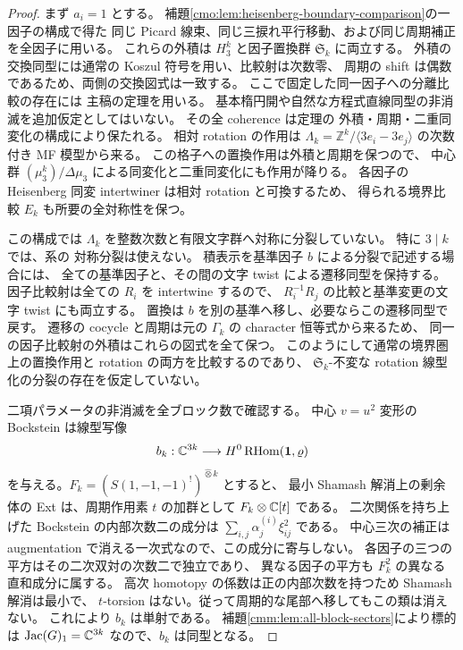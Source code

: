 \begin{proof}
まず $a_i=1$ とする。
補題\ref{cmo:lem:heisenberg-boundary-comparison}の一因子の構成で得た
同じ Picard 線束、同じ三捩れ平行移動、および同じ周期補正を全因子に用いる。
これらの外積は $H_3^k$ と因子置換群 $\mathfrak S_k$ に両立する。
外積の交換同型には通常の Koszul 符号を用い、比較射は次数零、
周期の shift は偶数であるため、両側の交換図式は一致する。
ここで固定した同一因子への分離比較の存在には
主稿の定理を用いる。
基本楕円開や自然な方程式直線同型の非消滅を追加仮定としてはいない。
その全 coherence は定理の
外積・周期・二重同変化の構成により保たれる。
相対 rotation の作用は
$\Lambda_k=\mathbb Z^k/\langle3e_i-3e_j\rangle$ の次数付き MF 模型から来る。
この格子への置換作用は外積と周期を保つので、
中心群 $(\mu_3^k)/\Delta\mu_3$ による同変化と二重同変化にも作用が降りる。
各因子の Heisenberg 同変 intertwiner は相対 rotation と可換するため、
得られる境界比較 $E_k$ も所要の全対称性を保つ。

この構成では $\Lambda_k$ を整数次数と有限文字群へ対称に分裂していない。
特に $3\mid k$ では、系の
対称分裂は使えない。
積表示を基準因子 $b$ による分裂で記述する場合には、
全ての基準因子と、その間の文字 twist による遷移同型を保持する。
因子比較射は全ての $R_i$ を intertwine するので、
$R_i^{-1}R_j$ の比較と基準変更の文字 twist にも両立する。
置換は $b$ を別の基準へ移し、必要ならこの遷移同型で戻す。
遷移の cocycle と周期は元の $\Gamma_k$ の character 恒等式から来るため、
同一の因子比較射の外積はこれらの図式を全て保つ。
このようにして通常の境界圏上の置換作用と rotation の両方を比較するのであり、
$\mathfrak S_k$-不変な rotation 線型化の分裂の存在を仮定していない。

二項パラメータの非消滅を全ブロック数で確認する。
中心 $v=u^2$ 変形の Bockstein は線型写像
\[
 b_k:\mathbb C^{3k}\longrightarrow
        H^0\operatorname{RHom}(\mathbf1,\varrho)
\]
を与える。$F_k=(S(1,-1,-1)^!)^{\widehat\otimes k}$ とすると、
最小 Shamash 解消上の剰余体の Ext は、周期作用素 $t$ の加群として
$F_k\otimes\mathbb C[t]$ である。
二次関係を持ち上げた Bockstein の内部次数二の成分は
$\sum_{i,j}\alpha^{(i)}_j\xi_{ij}^2$ である。
中心三次の補正は augmentation で消える一次式なので、この成分に寄与しない。
各因子の三つの平方はその二次双対の次数二で独立であり、
異なる因子の平方も $F_k^2$ の異なる直和成分に属する。
高次 homotopy の係数は正の内部次数を持つため Shamash 解消は最小で、
$t$-torsion はない。従って周期的な尾部へ移してもこの類は消えない。
これにより $b_k$ は単射である。
補題\ref{cmm:lem:all-block-sectors}により標的は
$\operatorname{Jac}(G)_1=\mathbb C^{3k}$ なので、$b_k$ は同型となる。


\end{proof}
